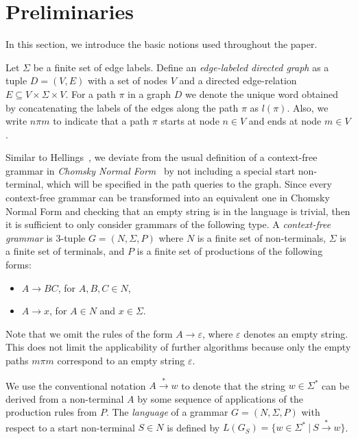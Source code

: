 \section{Preliminaries} \label{section_preliminaries}
In this section, we introduce the basic notions used throughout the paper.

Let $\Sigma$ be a finite set of edge labels. Define an \textit{edge-labeled directed graph} as a tuple $D = (V, E)$ with a set of nodes $V$ and a directed edge-relation $E \subseteq V \times \Sigma \times V$.  For a path $\pi$ in a graph $D$ we denote the unique word obtained by concatenating the labels of the edges along the path $\pi$ as $l(\pi)$. Also, we write $n \pi m$ to indicate that a path $\pi$ starts at node $n \in V$ and ends at node $m \in V$.

Similar to Hellings~\cite{hellingsRelational}, we deviate from the usual definition of a context-free grammar in \textit{Chomsky Normal Form}~\cite{chomsky} by not including a special start non-terminal, which will be specified in the path queries to the graph. Since every context-free grammar can be transformed into an equivalent one in Chomsky Normal Form and checking that an empty string is in the language is trivial, then it is sufficient to only consider grammars of the following type. A \textit{context-free grammar} is 3-tuple $G = (N, \Sigma, P)$ where $N$ is a finite set of non-terminals, $\Sigma$ is a finite set of terminals, and $P$ is a finite set of productions of the following forms:

\begin{itemize}
    \item $A \rightarrow B C$, for $A,B,C \in N$,
    \item $A \rightarrow x$, for $A \in N$ and $x \in \Sigma$.   
\end{itemize}

Note that we omit the rules of the form $A \rightarrow \varepsilon$, where $\varepsilon$ denotes an empty string. This does not limit the applicability of further algorithms because only the empty paths $m \pi m$ correspond to an empty string $\varepsilon$.

We use the conventional notation $A \xrightarrow{*} w$ to denote that the string $w \in \Sigma^*$ can be derived from a non-terminal $A$ by some sequence of applications of the production rules from $P$. The \textit{language} of a grammar $G = (N,\Sigma,P)$ with respect to a start non-terminal $S \in N$ is defined by $L(G_S) = \{w \in \Sigma^*~|~S \xrightarrow{*} w\}$.

